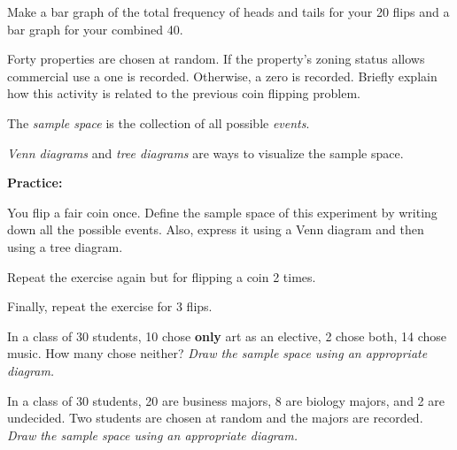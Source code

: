 \begin{problem}
\item Make a bar graph of the total frequency of heads and tails for
  your 20 flips and a bar graph for your combined 40. 

  \vfill

\item Forty properties are chosen at random. If the property's zoning
  status allows commercial use a one is recorded. Otherwise, a zero is
  recorded. Briefly explain how this activity is related to the
  previous coin flipping problem.

  \vspace{10em}
  


\clearpage

  \begin{definition}
    The \textit{sample space} is the collection of all possible
    \textit{events}.
  \end{definition}


  \begin{definition}
    \textit{Venn diagrams} and \textit{tree diagrams} are ways to
    visualize the sample space.
  \end{definition}



\item \textbf{Practice:}

  \begin{subproblem}
  \item You flip a fair coin once. Define the sample space of this
    experiment by writing down all the possible events. Also, express
    it using a Venn diagram and then using a tree diagram.

    \vfill

  \item Repeat the exercise again but for flipping a coin 2 times.

    \vfill
 
  \item Finally, repeat the exercise for 3 flips.

    \vfill

  \end{subproblem}


\clearpage

\item In a class of 30 students, 10 chose \textbf{only} art as an
  elective, 2 chose both, 14 chose music. How many chose neither?
  \textit{Draw the sample space using an appropriate diagram.}

  \vfill

\item In a class of 30 students, 20 are business majors, 8 are biology
  majors, and 2 are undecided. Two students are chosen at random and
  the majors are recorded.  \textit{Draw the sample space using an
    appropriate diagram.}

  \vfill


 \end{problem}



